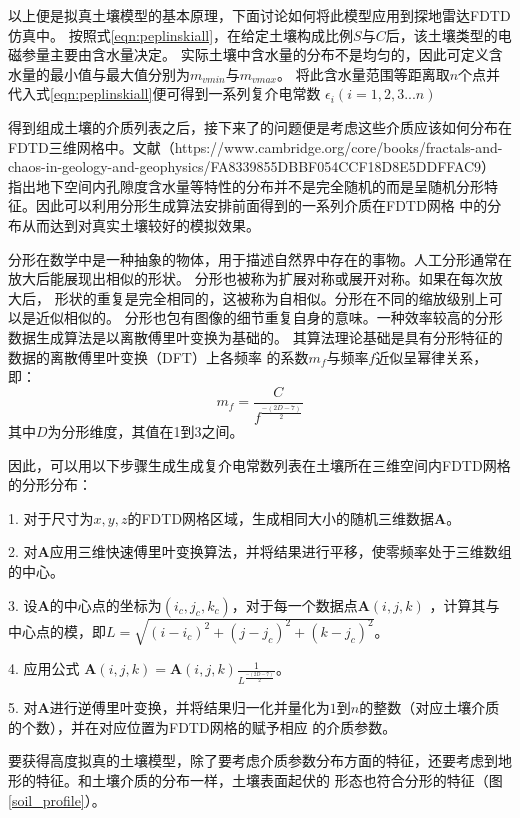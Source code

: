 以上便是拟真土壤模型的基本原理，下面讨论如何将此模型应用到探地雷达FDTD仿真中。
按照式\ref{eqn:peplinskiall}，在给定土壤构成比例$S$与$C$后，该土壤类型的电磁参量主要由含水量决定。
实际土壤中含水量的分布不是均匀的，因此可定义含水量的最小值与最大值分别为$m_{vmin}$与$m_{vmax}$。
将此含水量范围等距离取$n$个点并代入式\ref{eqn:peplinskiall}便可得到一系列复介电常数
$\epsilon_i(i=1,2,3...n)$ 

得到组成土壤的介质列表之后，接下来了的问题便是考虑这些介质应该如何分布在FDTD三维网格中。文献（https://www.cambridge.org/core/books/fractals-and-chaos-in-geology-and-geophysics/FA8339855DBBF054CCF18D8E5DDFFAC9）
指出地下空间内孔隙度含水量等特性的分布并不是完全随机的而是呈随机分形特征。因此可以利用分形生成算法安排前面得到的一系列介质在FDTD网格
中的分布从而达到对真实土壤较好的模拟效果。

分形在数学中是一种抽象的物体，用于描述自然界中存在的事物。人工分形通常在放大后能展现出相似的形状。 
分形也被称为扩展对称或展开对称。如果在每次放大后，
形状的重复是完全相同的，这被称为自相似。分形在不同的缩放级别上可以是近似相似的。 
分形也包有图像的细节重复自身的意味。一种效率较高的分形数据生成算法是以离散傅里叶变换为基础的。
其算法理论基础是具有分形特征的数据的离散傅里叶变换（DFT）上各频率
的系数$m_f$与频率$f$近似呈幂律关系，即：
\begin{equation}
m_f = \frac{C}{f^{\frac{-(2 D-7)}{2}}}
\end{equation}
其中$D$为分形维度，其值在1到3之间。

因此，可以用以下步骤生成生成复介电常数列表在土壤所在三维空间内FDTD网格的分形分布：

1. 对于尺寸为$x,y,z$的FDTD网格区域，生成相同大小的随机三维数据$\mathbf{A}$。

2. 对$\mathbf{A}$应用三维快速傅里叶变换算法，并将结果进行平移，使零频率处于三维数组
的中心。

3. 设$\mathbf{A}$的中心点的坐标为$(i_c,j_c,k_c)$，对于每一个数据点$\mathbf{A}(i,j,k)$
，计算其与中心点的模，即$L=\sqrt{(i - i_c)^2 + (j - j_c)^2 + (k - j_c)^2}$。

4. 应用公式 $\mathbf{A}(i,j,k) = \mathbf{A}(i,j,k) \frac{1}{L^{\frac{-(2 D-7)}{2}}}$。

5. 对$\mathbf{A}$进行逆傅里叶变换，并将结果归一化并量化为$1$到$n$的整数（对应土壤介质的个数），并在对应位置为FDTD网格的赋予相应
的介质参数。

要获得高度拟真的土壤模型，除了要考虑介质参数分布方面的特征，还要考虑到地形的特征。和土壤介质的分布一样，土壤表面起伏的
形态也符合分形的特征（图\ref{soil_profile}）。


